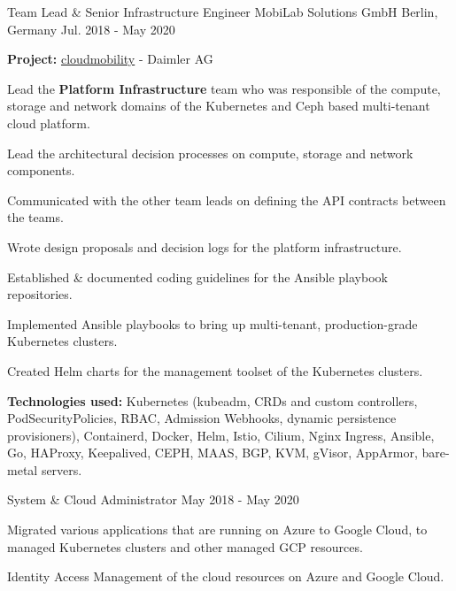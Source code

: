 
\begin{cventries}

    \cventry
    {Team Lead \& Senior Infrastructure Engineer}
    {MobiLab Solutions GmbH}
    {Berlin, Germany}
    {Jul. 2018 - May 2020}
    {
    \begin{cvitems}
        \item {\textbf{Project:} \href{https://cloudmobility.io}{cloudmobility} - Daimler AG}
        \newline
        \item {Lead the \textbf{Platform Infrastructure} team who was responsible of the compute,
        storage and network domains of the Kubernetes and Ceph based multi-tenant cloud platform.}
        \item {Lead the architectural decision processes on compute, storage and network components.}
        \item {Communicated with the other team leads on defining the API contracts between the teams.}
        \item {Wrote design proposals and decision logs for the platform infrastructure.}
        \item {Established \& documented coding guidelines for the Ansible playbook repositories.}
        \item {Implemented Ansible playbooks to bring up multi-tenant, production-grade Kubernetes clusters.}
        \item {Created Helm charts for the management toolset of the Kubernetes clusters.}
        \smallskip
        \item {
        \textbf{Technologies used:} Kubernetes (kubeadm, CRDs and custom controllers,
        PodSecurityPolicies, RBAC, Admission Webhooks, dynamic persistence provisioners),
        Containerd, Docker, Helm, Istio, Cilium, Nginx Ingress, Ansible, Go,
        HAProxy, Keepalived, CEPH, MAAS, BGP, KVM, gVisor, AppArmor, bare-metal servers.
        }
    \end{cvitems}
    }

    \cventry
    {System \& Cloud Administrator}
    {}
    {}
    {May 2018 - May 2020}
    {
    \begin{cvitems}
        \item {
        Migrated various applications that are running on Azure to Google Cloud,
        to managed Kubernetes clusters and other managed GCP resources.
        }
        \item {Identity Access Management of the cloud resources on Azure and Google Cloud.}
    \end{cvitems}
    }


\end{cventries}
